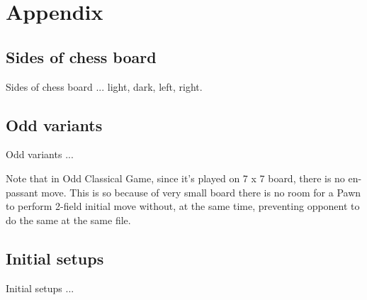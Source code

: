 
\chapter*{Appendix}

\section*{Sides of chess board}

Sides of chess board ... light, dark, left, right.

\section*{Odd variants}

Odd variants ...

Note that in Odd Classical Game, since it's played on 7 x 7 board,
there is no en-passant move. This is so because of very small board
there is no room for a Pawn to perform 2-field initial move without,
at the same time, preventing opponent to do the same at the same file.

\section*{Initial setups}
Initial setups ...





